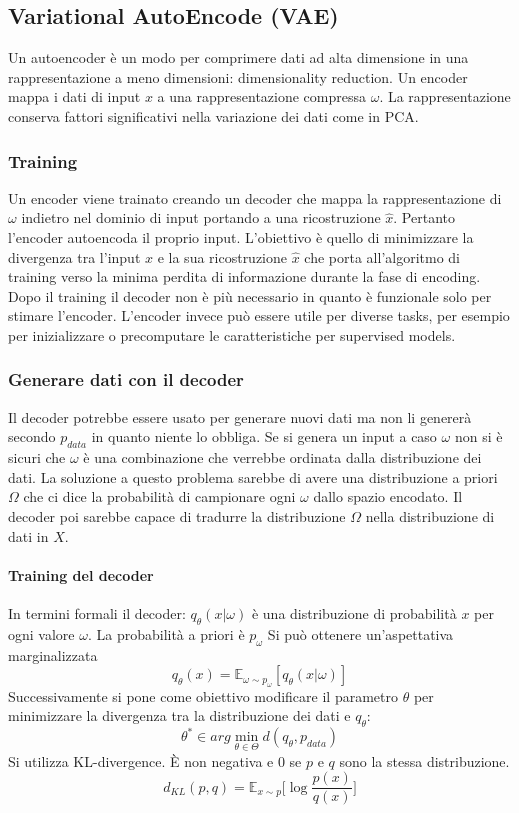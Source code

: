 	\subsection{Variational AutoEncode (VAE)}
	Un autoencoder \`e un modo per comprimere dati ad alta dimensione in una rappresentazione a meno dimensioni: dimensionality reduction.
	Un encoder mappa i dati di input $x$ a una rappresentazione compressa $\omega$.
	La rappresentazione conserva fattori significativi nella variazione dei dati come in PCA.

		\subsubsection{Training}
		Un encoder viene trainato creando un decoder che mappa la rappresentazione di $\omega$ indietro nel dominio di input portando a una ricostruzione $\hat{x}$.
		Pertanto l'encoder autoencoda il proprio input.
		L'obiettivo \`e quello di minimizzare la divergenza tra l'input $x$ e la sua ricostruzione $\hat{x}$ che porta all'algoritmo di training verso la minima perdita di informazione durante la fase di encoding.
		Dopo il training il decoder non \`e pi\`u necessario in quanto \`e funzionale solo per stimare l'encoder.
		L'encoder invece pu\`o essere utile per diverse tasks, per esempio per inizializzare o precomputare le caratteristiche per supervised models.

		\subsubsection{Generare dati con il decoder}
		Il decoder potrebbe essere usato per generare nuovi dati ma non li generer\`a secondo $p_{data}$ in quanto niente lo obbliga.
		Se si genera un input a caso $\omega$ non si \`e sicuri che $\omega$ \`e una combinazione che verrebbe ordinata dalla distribuzione dei dati.
		La soluzione a questo problema sarebbe di avere una distribuzione a priori $\Omega$ che ci dice la probabilit\`a di campionare ogni $\omega$ dallo spazio encodato.
		Il decoder poi sarebbe capace di tradurre la distribuzione $\Omega$ nella distribuzione di dati in $X$.

			\paragraph{Training del decoder}
			In termini formali il decoder: $q_\theta(x|\omega)$ \`e una distribuzione di probabilit\`a $x$ per ogni valore $\omega$.
			La probabilit\`a a priori \`e $p_\omega$
			Si pu\`o ottenere un'aspettativa marginalizzata
			$$q_\theta(x) = \mathbb{E}_{\omega\sim p_\omega}[q_\theta(x|\omega)]$$
			Successivamente si pone come obiettivo modificare il parametro $\theta$ per minimizzare la divergenza tra la distribuzione dei dati e $q_\theta$:
			$$\theta^*\in arg\min\limits_{\theta\in\Theta}d(q_\theta,p_{data})$$
			Si utilizza KL-divergence.
			\`E non negativa e $0$ se $p$ e $q$ sono la stessa distribuzione.
			$$d_{KL}(p,q) = \mathbb{E}_{x\sim p}\bigl[\log\frac{p(x)}{q(x)}\bigr]$$

